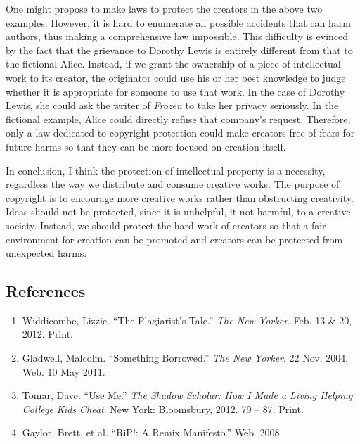 One might propose to make laws to protect the creators in the above two
examples. However, it is hard to enumerate all possible accidents that
can harm authors, thus making a comprehensive law impossible. This
difficulty is evinced by the fact that the grievance to Dorothy Lewis is
entirely different from that to the fictional Alice. Instead, if we
grant the ownership of a piece of intellectual work to its creator, the
originator could use his or her best knowledge to judge whether it is
appropriate for someone to use that work. In the case of Dorothy Lewis,
she could ask the writer of \emph{Frozen} to take her privacy seriously.
In the fictional example, Alice could directly refuse that company's
request. Therefore, only a law dedicated to copyright protection could
make creators free of fears for future harms so that they can be more
focused on creation itself.

In conclusion, I think the protection of intellectual property is a
necessity, regardless the way we distribute and consume creative works.
The purpose of copyright is to encourage more creative works rather than
obstructing creativity. Ideas should not be protected, since it is
unhelpful, it not harmful, to a creative society. Instead, we should
protect the hard work of creators so that a fair environment for
creation can be promoted and creators can be protected from unexpected
harms.

\subsection{References}\label{references}

\begin{enumerate}
\def\labelenumi{\arabic{enumi}.}
\tightlist
\item
  Widdicombe, Lizzie. ``The Plagiarist's Tale.'' \emph{The New Yorker}.
  Feb. 13 \& 20, 2012. Print.
\item
  Gladwell, Malcolm. ``Something Borrowed.'' \emph{The New Yorker}. 22
  Nov. 2004. Web. 10 May 2011.
\item
  Tomar, Dave. ``Use Me.'' \emph{The Shadow Scholar: How I Made a Living
  Helping College Kids Cheat}. New York: Bloomsbury, 2012. 79 -- 87.
  Print.
\item
  Gaylor, Brett, et al. ``RiP!: A Remix Manifesto.'' Web. 2008.
\end{enumerate}
